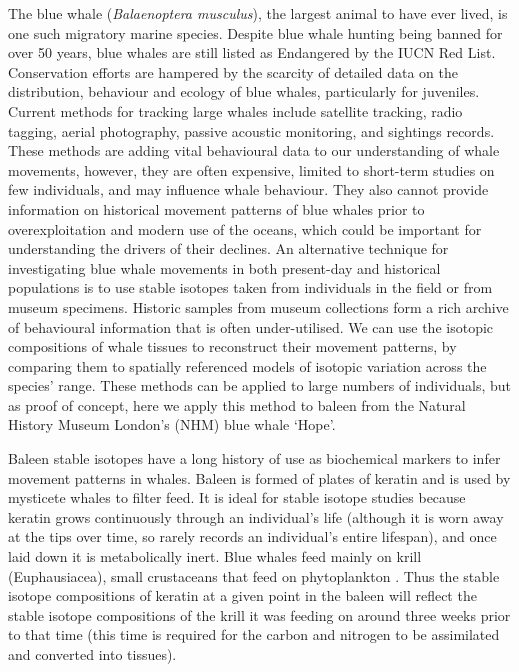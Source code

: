 \documentclass[a4paper,12pt]{article}
\begin{document}
The blue whale (\textit{Balaenoptera musculus}), the largest animal to have ever lived, is one such migratory marine species. 
Despite blue whale hunting being banned for over 50 years, blue whales are still listed as Endangered by the IUCN Red List\cite{reilly2008balaenoptera}.
Conservation efforts are hampered by the scarcity of detailed data on the distribution, behaviour and ecology of blue whales, particularly for juveniles. 
Current methods for tracking large whales include satellite tracking, radio tagging, aerial photography, passive acoustic monitoring, and sightings records\cite{borger15,mcdonald2006biogeographic,bailey2009behavioural,mate2007evolution,silva2013north}. 
These methods are adding vital behavioural data to our understanding of whale movements, however, they are often expensive, limited to short-term studies on few individuals\cite{bailey2009behavioural,best2015tag,mate2007evolution}, and may influence whale behaviour\cite{walker2012review}. 
They also cannot provide information on historical movement patterns of blue whales prior to overexploitation and modern use of the oceans, which could be important for understanding the drivers of their declines.
An alternative technique for investigating blue whale movements in both present-day and historical populations is to use stable isotopes taken from individuals in the field or from museum specimens\cite{west2006stable,busquets2017estimating,hobson2008tracking}. 
Historic samples from museum collections form a rich archive of behavioural information \cite{lister2011natural} that is often under-utilised.
We can use the isotopic compositions of whale tissues to reconstruct their movement patterns, by comparing them to spatially referenced models of isotopic variation across the species' range\cite{hobson1999tracing,hobson2008tracking,eisenmann2016isotopic}. 
These methods can be applied to large numbers of individuals, but as proof of concept, here we apply this method to baleen from the Natural History Museum London's (NHM) blue whale `Hope'.
 
Baleen stable isotopes have a long history of use as biochemical markers to infer movement patterns in whales\cite{ryan2013stable,best1996stable,hobson1998stable,hobson2008tracking}.
Baleen is formed of plates of keratin and is used by mysticete whales to filter feed. 
It is ideal for stable isotope studies because keratin grows continuously through an individual's life (although it is worn away at the tips over time, so rarely records an individual's entire lifespan), and once laid down it is metabolically inert\cite{best1996stable}. 
Blue whales feed mainly on krill (Euphausiacea), small crustaceans that feed on phytoplankton \cite{handbook}.
Thus the stable isotope compositions of keratin at a given point in the baleen will reflect the stable isotope compositions of the krill it was feeding on around three weeks prior to that time (this time is required for the carbon and nitrogen to be assimilated and converted into tissues). %
\end{document}
